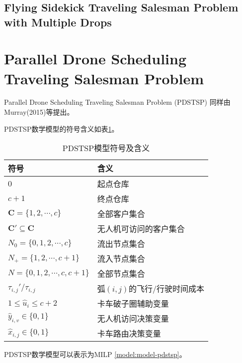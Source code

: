 \subsection{Flying Sidekick Traveling Salesman Problem with Multiple Drops}

\section{Parallel Drone Scheduling Traveling Salesman Problem}

Parallel Drone Scheduling Traveling Salesman Problem (PDSTSP) 同样由Murray(2015)等\cite{murrayFlyingSidekickTraveling2015}提出。

PDSTSP数学模型的符号含义如表\ref{tab:pdstsp-sign-meaning}。

\begin{table}[!htbp]
    \centering
    \caption{PDSTSP模型符号及含义}
    \label{tab:pdstsp-sign-meaning}
    \begin{tabularx}{\textwidth}{lX}
        \toprule[1pt] %
        符号 & 含义 \\
        \midrule[0.75pt] %
        $0$ & 起点仓库 \\
        $c + 1$ & 终点仓库 \\
        $\mathbf{C}=\{1,2,\cdots,c\}$ & 全部客户集合 \\
        $\mathbf{C}' \subseteq \mathbf{C}$ & 无人机可访问的客户集合 \\
        $N_0 = \{0,1,2,\cdots,c\}$ & 流出节点集合 \\
        $N_+ = \{1,2,\cdots,c + 1\}$ & 流入节点集合 \\
        $N = \{0,1,2,\cdots,c,c + 1\}$ & 全部节点集合 \\
        $\tau_{i,j}'/\tau_{i,j}$ & 弧$(i,j)$的飞行/行驶时间成本 \\
        $1 \leq \hat{u}_i \leq c + 2$ & 卡车破子圈辅助变量 \\
        $\hat{y}_{i,v} \in \{0, 1\}$ & 无人机访问决策变量\\ 
        $\hat{x}_{i,j} \in \{0, 1\}$ & 卡车路由决策变量\\ 
        \bottomrule[1pt] %
    \end{tabularx}
\end{table}

PDSTSP数学模型可以表示为MILP \ref{model:model-pdstsp}。

